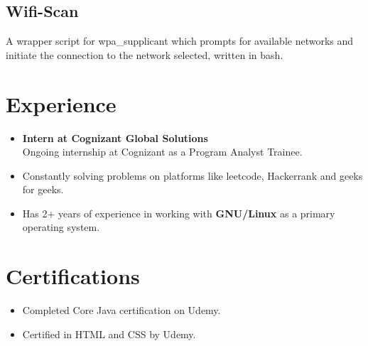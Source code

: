 \documentclass[11pt,a4paper]{article}
\begin{document}
\begin{tcolorbox}
\begin{minipage}[t]{10cm}
\begin{tcolorbox}[grow to right by=0.75cm,colframe=white,colback=white]
			\subsection*{Wifi-Scan}
			A wrapper script for wpa\_supplicant which prompts for available networks and initiate the
			connection to the network selected, written in bash.

		\section*{Experience}
		\begin{itemize}[leftmargin=3mm]
			\item{\textbf{Intern at Cognizant Global Solutions} \\
			Ongoing internship at Cognizant as a Program Analyst Trainee.
			}
			\item{Constantly solving problems on platforms like leetcode, Hackerrank and geeks for geeks.}
			\item{Has 2+ years of experience in working with \textbf{GNU/Linux} as a primary operating system.}
		\end{itemize}

		\section*{Certifications}
		\begin{itemize}[leftmargin=3mm]
		\item{Completed Core Java certification on Udemy.}
		\item{Certified in HTML and CSS by Udemy.}
		\end{itemize}
	\end{tcolorbox}
	\end{minipage}
\end{tcolorbox}
\end{document}
